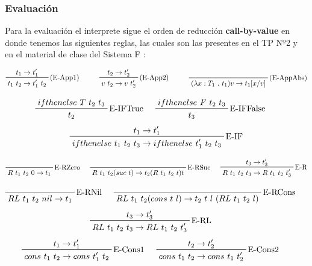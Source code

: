 \documentclass[12pt, titlepage, a4paper]{article}
\begin{document}
\subsubsection{Evaluación}
Para la evaluación el interprete sigue el orden de reducción \textbf{call-by-value} en donde tenemos las siguientes reglas, las cuales 
son las presentes en el TP Nº2 \cite{tp2:lambdaCalculoSimpleTipado} y en el material de clase del Sistema F \cite{ALP:Polimorfismo}:

\begin{displaymath}
    \prftree[r]{(E-App1)}{t_1 \rightarrow t_1'}{t_1 \ t_2 \rightarrow t_1' \ t_2}  \hspace{1cm}
    \prftree[r]{(E-App2)}{t_2 \rightarrow t_2'}{v \ t_2 \rightarrow v \ t_2'}  \hspace{1cm}
    \prftree[r]{(E-AppAbs)}{}{(\lambda x : T_1 \ . \ t_1 ) v \rightarrow t_1[x/v]}
\end{displaymath}

\begin{displaymath}
    \prftree[r]{E-IFTrue}{ifthenelse \ T \ t_2 \ t_3}{t_2} \hspace{0.5cm}
    \prftree[r]{E-IFFalse}{ifthenelse \ F \ t_2 \ t_3}{t_3} \hspace{0.5cm}
\end{displaymath}
\begin{displaymath}
    \prftree[r]{E-IF}{t_1 \rightarrow t_1'}{ifthenelse \ t_1 \ t_2 \ t_3 \rightarrow ifthenelse \ t_1' \ t_2 \ t_3}
\end{displaymath}

\begin{displaymath}
    \prftree[r]{E-RZero}{R \ t_1 \ t_2 \ 0 \rightarrow t_1} \hspace{0.5cm}
    \prftree[r]{E-RSuc}{R \ t_1 \ t_2 (suc \ t) \rightarrow t_2 (R \ t_1 \ t_2 \ t) t} \hspace{0.5cm}
    \prftree[r]{E-R}{t_3 \rightarrow t_3'}{R \ t_1 \ t_2 \ t_3 \rightarrow R \ t_1 \ t_2 \ t_3'}
\end{displaymath}


\begin{displaymath}
    \prftree[r]{E-RNil}{RL \ t_1 \ t_2 \ nil \rightarrow t_1} \hspace{0.5cm}
    \prftree[r]{E-RCons}{RL \ t_1 \ t_2 (cons \ t \ l) \rightarrow t_2 \ t \ l \ (RL \ t_1 \ t_2 \ l)} \hspace{0.5cm}
\end{displaymath}
\begin{displaymath}
    \prftree[r]{E-RL}{t_3 \rightarrow t_3'}{RL \ t_1 \ t_2 \ t_3 \rightarrow RL \ t_1 \ t_2 \ t_3'} \hspace{0.5cm}
\end{displaymath}
\begin{displaymath}
  \prftree[r]{E-Cons1}{t_1 \rightarrow t_1'}{cons \ t_1 \ t_2 \rightarrow cons \ t_1' \ t_2} \hspace{0.5cm}
  \prftree[r]{E-Cons2}{t_2 \rightarrow t_2'}{cons \ t_1 \ t_2 \rightarrow cons \ t_1 \ t_2'} \hspace{0.5cm}
\end{displaymath}
\end{document}
